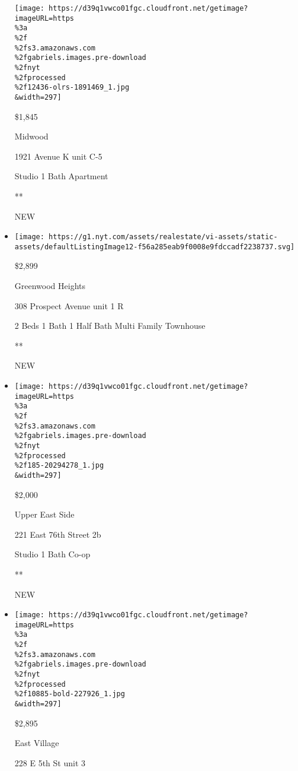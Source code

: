 \begin{itemize}
  \texttt{[image: https://d39q1vwco01fgc.cloudfront.net/getimage?imageURL=https\\\%3a\\\%2f\\\%2fs3.amazonaws.com\\\%2fgabriels.images.pre-download\\\%2fnyt\\\%2fprocessed\\\%2f12436-olrs-1891469\_1.jpg\\\&width=297]}

  \$1,845

  Midwood

  1921 Avenue K unit C-5

  Studio \textbar{} 1 Bath \textbar{} Apartment

  **

  NEW
\item
  \href{/real-estate/usa/ny/brooklyn/greenwood-heights/homes-for-rent/308-prospect-avenue/13278-PRCH-3015693?}{}

  \texttt{[image: https://g1.nyt.com/assets/realestate/vi-assets/static-assets/defaultListingImage12-f56a285eab9f0008e9fdccadf2238737.svg]}

  \$2,899

  Greenwood Heights

  308 Prospect Avenue unit 1 R

  2 Beds \textbar{} 1 Bath \textbar{} 1 Half Bath \textbar{} Multi
  Family Townhouse

  **

  NEW
\item
  \href{/real-estate/usa/ny/new-york/upper-east-side/homes-for-rent/221-east-76th-street-2b/185-20294278?}{}

  \texttt{[image: https://d39q1vwco01fgc.cloudfront.net/getimage?imageURL=https\\\%3a\\\%2f\\\%2fs3.amazonaws.com\\\%2fgabriels.images.pre-download\\\%2fnyt\\\%2fprocessed\\\%2f185-20294278\_1.jpg\\\&width=297]}

  \$2,000

  Upper East Side

  221 East 76th Street 2b

  Studio \textbar{} 1 Bath \textbar{} Co-op

  **

  NEW
\item
  \href{/real-estate/usa/ny/new-york/east-village/homes-for-rent/228-e-5th-st/10885-BOLD-227926?}{}

  \texttt{[image: https://d39q1vwco01fgc.cloudfront.net/getimage?imageURL=https\\\%3a\\\%2f\\\%2fs3.amazonaws.com\\\%2fgabriels.images.pre-download\\\%2fnyt\\\%2fprocessed\\\%2f10885-bold-227926\_1.jpg\\\&width=297]}

  \$2,895

  East Village

  228 E 5th St unit 3


\end{itemize}
